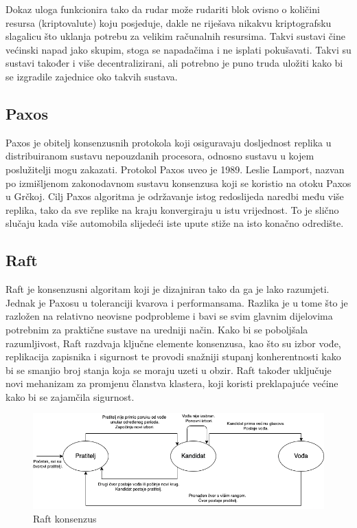 \documentclass[times, utf8, diplomski]{fer}
\begin{document}
Dokaz uloga funkcionira tako da rudar može rudariti blok ovisno o količini resursa (kriptovalute) koju posjeduje, dakle ne riješava nikakvu kriptografsku slagalicu što uklanja potrebu za velikim računalnih resursima. Takvi sustavi čine većinski napad jako skupim, stoga se napadačima i ne isplati pokušavati. Takvi su sustavi također i više decentralizirani, ali potrebno je puno truda uložiti kako bi se izgradile zajednice oko takvih sustava.

\subsection{Paxos}

Paxos je obitelj konsenzusnih protokola koji osiguravaju dosljednost replika u distribuiranom sustavu nepouzdanih procesora, odnosno sustavu u kojem poslužitelji mogu zakazati. Protokol Paxos uveo je 1989. Leslie Lamport, nazvan po izmišljenom zakonodavnom sustavu konsenzusa koji se koristio na otoku Paxos u Grčkoj. Cilj Paxos algoritma je održavanje istog redoslijeda naredbi među više replika, tako da sve replike na kraju konvergiraju u istu vrijednost. To je slično slučaju kada više automobila slijedeći iste upute stiže na isto konačno odredište.

\subsection{Raft}
\label{sec:raft}
Raft je konsenzusni algoritam koji je dizajniran tako da ga je lako razumjeti. Jednak je Paxosu u toleranciji kvarova i performansama. Razlika je u tome što je razložen na relativno neovisne podprobleme i bavi se svim glavnim dijelovima potrebnim za praktične sustave na uredniji način. Kako bi se poboljšala razumljivost, Raft razdvaja ključne elemente konsenzusa, kao što su izbor vođe, replikacija zapisnika i sigurnost te provodi snažniji stupanj konherentnosti kako bi se smanjio broj stanja koja se moraju uzeti u obzir. Raft također uključuje novi mehanizam za promjenu članstva klastera,
koji koristi preklapajuće većine kako bi se zajamčila sigurnost. \cite{raft}

\begin{figure}[htb]
\centering
\includegraphics[width=12cm]{imgs/Raft.png}
\caption{Raft konsenzus}
\label{fig:raft}
\end{figure}
\end{document}
